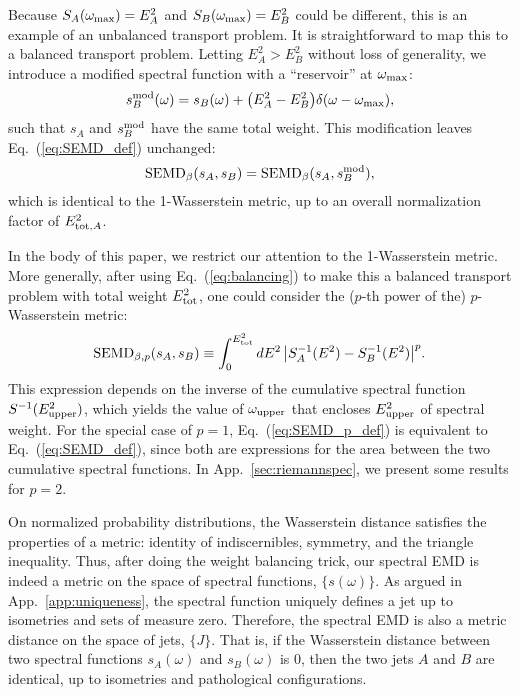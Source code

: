 \documentclass[letterpaper,11pt]{article}
\DeclareRobustCommand{\App}[1]{App.~\ref{#1}}
\DeclareRobustCommand{\Eq}[1]{Eq.~(\ref{#1})}
\begin{document}
Because $S_A(\omega_{\rm max}) = E^2_{A}$  and $S_B(\omega_{\rm max}) = E^2_{B}$ could be different, this is an example of an unbalanced transport problem.
%
It is straightforward to map this to a balanced transport problem.
%
Letting $E^2_{A} > E^2_{B}$ without loss of generality, we introduce a modified spectral function with a ``reservoir'' at $\omega_{\rm max}$:
%
\begin{equation}
\label{eq:balancing}
s_B^{\rm mod}(\omega) = s_B(\omega) + \big(E^2_{A} - E^2_{B} \big) \delta(\omega-\omega_{\rm max}),
\end{equation}
%
such that $s_A$ and $s_B^{\rm mod}$ have the same total weight.
%
This modification leaves \Eq{eq:SEMD_def} unchanged:
%
\begin{equation}
\text{SEMD}_{\beta}(s_A, s_B) = \text{SEMD}_{\beta}(s_A, s_B^{\rm mod}),
\end{equation}
%
which is identical to the 1-Wasserstein metric, up to an overall normalization factor of $E^2_{{\rm tot},A}$.


In the body of this paper, we restrict our attention to the 1-Wasserstein metric.
%
More generally, after using \Eq{eq:balancing} to make this a balanced transport problem with total weight $E^2_{\rm tot}$, one could consider the ($p$-th power of the) $p$-Wasserstein metric:
%
\begin{equation}
\label{eq:SEMD_p_def}
\text{SEMD}_{\beta,p}(s_A, s_B) \equiv \int_{0}^{E^2_{\rm tot}} dE^2\, \big| S^{-1}_A(E^2) - S^{-1}_B(E^2) \big|^p .
\end{equation}
%
This expression depends on the inverse of the cumulative spectral function $S^{-1}(E_{\rm upper}^2)$, which yields the value of $\omega_{\rm upper}$ that encloses $E_{\rm upper}^2$ of spectral weight.
%
For the special case of $p = 1$, \Eq{eq:SEMD_p_def} is equivalent to \Eq{eq:SEMD_def}, since both are expressions for the area between the two cumulative spectral functions.
%
In \App{sec:riemannspec}, we present some results for $p=2$.


On normalized probability distributions, the Wasserstein distance satisfies the properties of a metric: identity of indiscernibles, symmetry, and the triangle inequality.
%
Thus, after doing the weight balancing trick, our spectral EMD is indeed a metric on the space of spectral functions, $\{s(\omega)\}$.
%
As argued in \App{app:uniqueness}, the spectral function uniquely defines a jet up to isometries and sets of measure zero.
%
Therefore, the spectral EMD is also a metric distance on the space of jets, $\{J\}$.
%
That is, if the Wasserstein distance between two spectral functions $s_A(\omega)$ and $s_B(\omega)$ is 0, then the two jets $A$ and $B$ are identical, up to isometries and pathological configurations.
\end{document}
